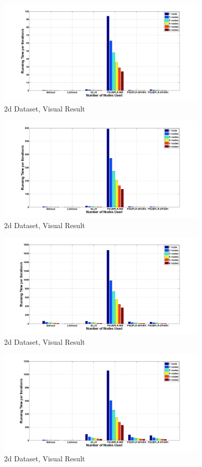 \documentclass{llncs}
\begin{document}
\begin{figure}[tb] \label{fig:09}
\center \includegraphics[height=5cm,width=10cm]{img/2d_time.png}
\caption{2d Dataset, Visual Result}
\end{figure}

\begin{figure}[tb] \label{fig:10}
\center \includegraphics[height=5cm,width=10cm]{img/20NewsGroup_time.png}
\caption{2d Dataset, Visual Result}
\end{figure}

\begin{figure}[tb] \label{fig:11}
\center \includegraphics[height=5cm,width=10cm]{img/Gisette_time.png}
\caption{2d Dataset, Visual Result}
\end{figure}

\begin{figure}[tb] \label{fig:12}
\center \includegraphics[height=5cm,width=10cm]{img/ECUESpam_time.png}
\caption{2d Dataset, Visual Result}
\end{figure}
\end{document}
